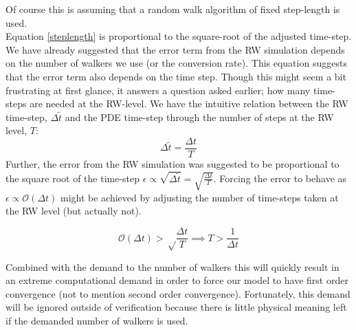 Of course this is assuming that a random walk algorithm of fixed step-length is used.\\
Equation \ref{steplength} is proportional to the square-root of the adjusted time-step. 
We have already suggested that the error term from the RW simulation depends on the number of walkers we use (or the conversion rate). This equation suggests that the error term also depends on the time step. 
Though this might seem a bit frustrating at first glance, it answers a question asked earlier; how many time-steps are needed at the RW-level. 
We have the intuitive relation between the RW time-step, $\Delta \tilde t$ and the PDE time-step through the number of steps at the RW level, $T$:
\begin{equation*}
 \Delta \tilde t = \frac{\Delta t}{T}
\end{equation*}
Further, the error from the RW simulation was suggested to be proportional to the square root of the time-step $\epsilon \propto \sqrt{\Delta \tilde t} = \sqrt{\frac{\Delta t}{T}}$. 
Forcing the error to behave as $\epsilon\propto\mathcal O(\Delta t)$ might be achieved by adjusting the number of time-steps taken at the RW level (but actually not).

\begin{equation}
 \mathcal O(\Delta t)>\sqrt \frac{\Delta t}{T} \implies T>\frac{1}{\Delta t}
\end{equation}

Combined with the demand to the number of walkers this will quickly result in an extreme computational demand in order to force our model to have first order convergence (not to mention second order convergence). 
Fortunately, this demand will be ignored outside of verification because there is little physical meaning left if the demanded number of walkers is used.

